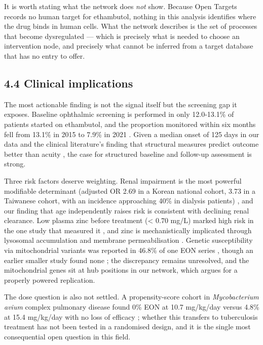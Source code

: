 \documentclass[utf8]{FrontiersinVancouver}
\begin{document}
It is worth stating what the network does \textit{not} show. Because Open Targets records no human target for ethambutol, nothing in this analysis identifies where the drug binds in human cells. What the network describes is the set of processes that become dysregulated --- which is precisely what is needed to choose an intervention node, and precisely what cannot be inferred from a target database that has no entry to offer.

\subsection{4.4 Clinical implications}

The most actionable finding is not the signal itself but the screening gap it exposes. Baseline ophthalmic screening is performed in only 12.0-13.1\% of patients started on ethambutol, and the proportion monitored within six months fell from 13.1\% in 2015 to 7.9\% in 2021 \citep{j2024}. Given a median onset of 125 days in our data and the clinical literature's finding that structural measures predict outcome better than acuity \citep{jy2018,mc2024,ke2025,j2025}, the case for structured baseline and follow-up assessment is strong.

Three risk factors deserve weighting. Renal impairment is the most powerful modifiable determinant (adjusted OR 2.69 in a Korean national cohort, 3.73 in a Taiwanese cohort, with an incidence approaching 40\% in dialysis patients) \citep{hy2012,v2019,j2024}, and our finding that age independently raises risk is consistent with declining renal clearance. Low plasma zinc before treatment (< 0.70 mg/L) marked high risk in the one study that measured it \citep{e1978}, and zinc is mechanistically implicated through lysosomal accumulation and membrane permeabilisation \citep{h2009}. Genetic susceptibility via mitochondrial variants was reported in 46.8\% of one EON series \citep{xh2021}, though an earlier smaller study found none \citep{jm2003}; the discrepancy remains unresolved, and the mitochondrial genes sit at hub positions in our network, which argues for a properly powered replication.

The dose question is also not settled. A propensity-score cohort in \textit{Mycobacterium avium} complex pulmonary disease found 0\% EON at 10.7 mg/kg/day versus 4.8\% at 15.4 mg/kg/day with no loss of efficacy \citep{y2026}; whether this transfers to tuberculosis treatment has not been tested in a randomised design, and it is the single most consequential open question in this field.
\end{document}

